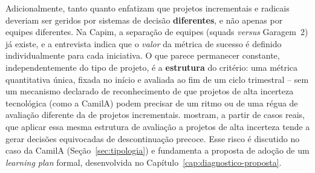 Adicionalmente, tanto \textcite{salernogomes2018} quanto \textcite{oconnormeyer2026} enfatizam que projetos incrementais e radicais deveriam ser geridos por sistemas de decisão \textbf{diferentes}, e não apenas por equipes diferentes. Na Capim, a separação de equipes (squads \textit{versus} Garagem~2) já existe, e a entrevista indica que o \textit{valor} da métrica de sucesso é definido individualmente para cada iniciativa. O que parece permanecer constante, independentemente do tipo de projeto, é a \textbf{estrutura} do critério: uma métrica quantitativa única, fixada no início e avaliada ao fim de um ciclo trimestral -- sem um mecanismo declarado de reconhecimento de que projetos de alta incerteza tecnológica (como a CamilA) podem precisar de um ritmo ou de uma régua de avaliação diferente da de projetos incrementais. \textcite{salernogomes2018} mostram, a partir de casos reais, que aplicar essa mesma estrutura de avaliação a projetos de alta incerteza tende a gerar decisões equivocadas de descontinuação precoce. Esse risco é discutido no caso da CamilA (Seção~\ref{sec:tipologia}) e fundamenta a proposta de adoção de um \textit{learning plan} formal, desenvolvida no Capítulo~\ref{cap:diagnostico-proposta}.
